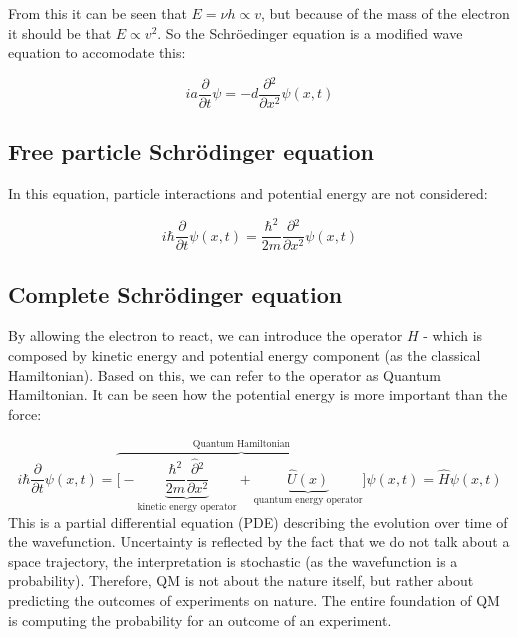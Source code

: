 \noindent
From this it can be seen that $E=\nu h\propto v$, but because of the mass of the electron it should be that $E\propto v^2$.
So the Schr\"oedinger equation is a modified wave equation to accomodate this:

$$ia \frac{\partial {}}{\partial {t}}\psi=-d \frac{\partial {^2}}{\partial {x^2}}\psi(x,t)$$

  \subsection{Free particle Schr\"odinger equation}
  In this equation, particle interactions and potential energy are not considered:

  $$i\hbar \frac{\partial {}}{\partial {t}}\psi(x,t) = \frac{\hbar^2}{2m}\frac{\partial {^2}}{\partial {x^2}}\psi(x,t)$$

  \subsection{Complete Schr\"odinger equation}
  By allowing the electron to react, we can introduce the operator $H$ - which is composed by kinetic energy and potential energy component (as the classical Hamiltonian). Based on this, we can refer to the operator as Quantum Hamiltonian.
  It can be seen how the potential energy is more important than the force:

  $$i\hbar \frac{\partial {}}{\partial {t}}\psi(x,t) = \overbrace{\biggl[-\underbrace{\frac{\hbar^2}{2m}\frac{\hat{\partial} {^2}}{\partial {x^2}}}_{\text{kinetic energy operator}}+\underbrace{\hat{U}(x)}_{\text{quantum energy operator}}\biggr]}^{\text{Quantum Hamiltonian}}\psi(x,t) = \hat{H}\psi(x,t)$$
  This is a partial differential equation (PDE) describing the evolution over time of the wavefunction. Uncertainty is reflected by the fact that we do not talk about a space trajectory, the interpretation is stochastic (as the wavefunction is a probability). Therefore, QM is not about the nature itself, but rather about predicting the outcomes of experiments on nature. The entire foundation of QM is computing the probability for an outcome of an experiment. 
